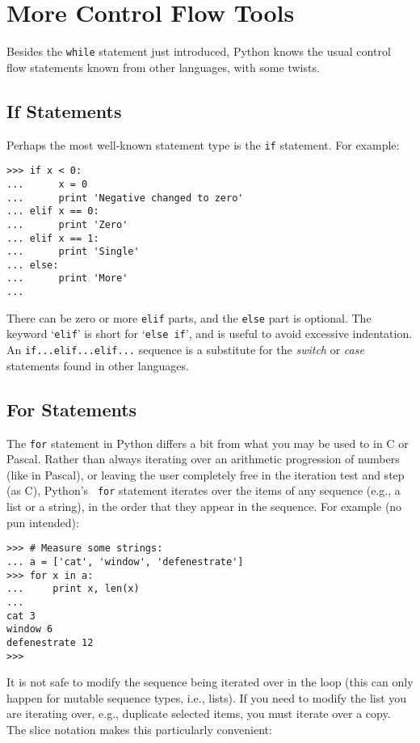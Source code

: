 \chapter{More Control Flow Tools}

Besides the {\tt while} statement just introduced, Python knows the
usual control flow statements known from other languages, with some
twists.

\section{If Statements}

Perhaps the most well-known statement type is the {\tt if} statement.
For example:

\bcode\begin{verbatim}
>>> if x < 0:
...      x = 0
...      print 'Negative changed to zero'
... elif x == 0:
...      print 'Zero'
... elif x == 1:
...      print 'Single'
... else:
...      print 'More'
... 
\end{verbatim}\ecode
%
There can be zero or more {\tt elif} parts, and the {\tt else} part is
optional.  The keyword `{\tt elif}' is short for `{\tt else if}', and is
useful to avoid excessive indentation.  An {\tt if...elif...elif...}
sequence is a substitute for the {\em switch} or {\em case} statements
found in other languages.

\section{For Statements}

The {\tt for} statement in Python differs a bit from what you may be
used to in C or Pascal.  Rather than always iterating over an
arithmetic progression of numbers (like in Pascal), or leaving the user
completely free in the iteration test and step (as C), Python's {\tt
for} statement iterates over the items of any sequence (e.g., a list
or a string), in the order that they appear in the sequence.  For
example (no pun intended):

\bcode\begin{verbatim}
>>> # Measure some strings:
... a = ['cat', 'window', 'defenestrate']
>>> for x in a:
...     print x, len(x)
... 
cat 3
window 6
defenestrate 12
>>> 
\end{verbatim}\ecode
%
It is not safe to modify the sequence being iterated over in the loop
(this can only happen for mutable sequence types, i.e., lists).  If
you need to modify the list you are iterating over, e.g., duplicate
selected items, you must iterate over a copy.  The slice notation
makes this particularly convenient:

